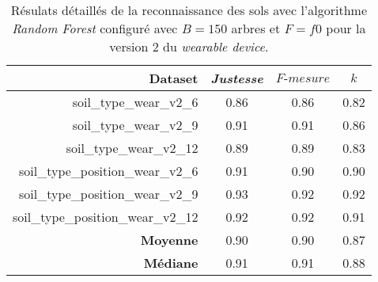 \begin{table}[H]\renewcommand{\arraystretch}{0.5}
	\centering
	\caption{Résulats détaillés de la reconnaissance des sols avec l'algorithme \textit{Random Forest} configuré avec $B=150$ arbres et $F=f0$ pour la version 2 du \textit{wearable device}.}
	\label{tab:tab:rf-150-f0-wear-v2}
	\begin{tabular}{@{}rccc@{}}
		\toprule
			\textbf{Dataset} & \textit{Justesse} & $F\mbox{-} mesure$ & \textbf{$k$} \\
		\midrule
			soil\_type\_wear\_v2\_6 & 0.86 & 0.86 & 0.82 \\
			soil\_type\_wear\_v2\_9 & 0.91 & 0.91 & 0.86 \\
			soil\_type\_wear\_v2\_12 & 0.89 & 0.89 & 0.83 \\
			soil\_type\_position\_wear\_v2\_6 & 0.91 & 0.90 & 0.90 \\
			soil\_type\_position\_wear\_v2\_9 & 0.93 & 0.92 & 0.92 \\
			soil\_type\_position\_wear\_v2\_12 & 0.92 & 0.92 & 0.91 \\
			\textbf{Moyenne} & 0.90 & 0.90 & 0.87 \\
			\textbf{Médiane} & 0.91 & 0.91 & 0.88 \\
		\bottomrule
	\end{tabular}
\end{table}

